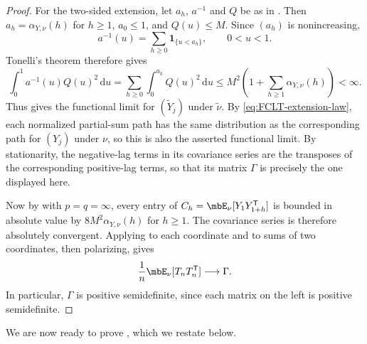 \documentclass[a4paper]{article}
\numberwithin{equation}{section}   %
\theoremstyle{plain}   %
\theoremstyle{plain}   %
\theoremstyle{examplestyle}
\newcommand{\dee}{\mathrm{d}}           %
\begin{document}
\begin{proof}
        For the two-sided extension, let $a_h$, $a^{-1}$ and $Q$ be as in . 
        Then $a_h=\alpha_{Y,\nu}(h)$ for $h\ge1$,  $a_0\le1$, and $Q(u)\le M$. Since $(a_h)$ is nonincreasing,
        \[
             a^{-1}(u)=\sum_{h\ge0}\mathbf1_{\{u<a_h\}},
             \qquad 0<u<1.
        \]
        Tonelli's theorem therefore gives
        \[
             \int_0^1 a^{-1}(u)Q(u)^2\,\dee u
             =\sum_{h\ge0}\int_0^{a_h}Q(u)^2\,\dee u
             \le M^2\left(1+\sum_{h\ge1}\alpha_{Y,\nu}(h)\right)<\infty.
        \]
        Thus  gives the functional limit for $(\widetilde Y_j)$ under $\widetilde\nu$.
        By \eqref{eq:FCLT-extension-law}, each normalized partial-sum path has the same distribution as the corresponding path for $(Y_j)$  under $\nu$, so this is also the asserted functional limit.
        By stationarity, the negative-lag terms in its covariance series are the transposes of the corresponding positive-lag terms, so that its matrix  $\Gamma$ is precisely the one displayed here.
        
        Now by  with $p=q=\infty$, every entry of $C_h=\mbE_\nu[Y_1Y_{1+h}^{\mathsf T}]$ is bounded in absolute value by $8M^2\alpha_{Y,\nu}(h)$ for $h\ge1$.
        The covariance series is therefore absolutely convergent. Applying  to each coordinate and to sums of two coordinates, then polarizing, gives
        \[
            \frac1n\mbE_\nu[T_nT_n^{\mathsf T}]\longrightarrow\Gamma.
        \]
        In particular, $\Gamma$ is positive semidefinite, since each matrix on the left is positive semidefinite.
    \end{proof}
        
    We are now ready to prove , which we restate below. 

    \annealedclt*
\end{document}
